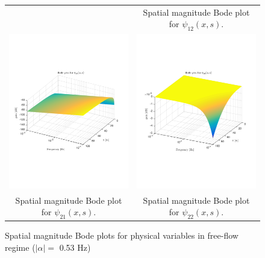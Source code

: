 \documentclass[preprint]{elsarticle}
\begin{document}
\begin{figure}
\begin{tabular}{cc}
&
Spatial magnitude Bode plot for $\psi_{12}(x,s)$.
\tabularnewline
\includegraphics[trim = 0mm 60mm 0mm 60mm, width = 8cm]{Bode_free_flow/distr_vq_psi_21}
&
\includegraphics[trim = 0mm 60mm 0mm 60mm, width = 8cm]{Bode_free_flow/distr_vq_psi_22}
\tabularnewline
Spatial magnitude Bode plot for $\psi_{21}(x,s)$.
&
Spatial magnitude Bode plot for $\psi_{22}(x,s)$.
\tabularnewline
\end{tabular}
\caption{Spatial magnitude Bode plots for physical variables in free-flow regime ($\left|\alpha\right| = $ 0.53 Hz)\label{fig:Magn_spatial_physx}}
\end{figure}

\end{document}
